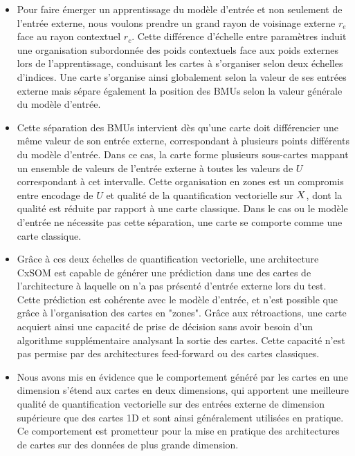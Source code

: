 \begin{itemize}
    \item Pour faire émerger un apprentissage du modèle d'entrée et non seulement de l'entrée externe, nous voulons prendre un grand rayon de voisinage externe $r_e$ face au rayon contextuel $r_c$. Cette différence d'échelle entre paramètres induit une organisation subordonnée des poids contextuels face aux poids externes lors de l'apprentissage, conduisant les cartes à s'organiser selon deux échelles d'indices. Une carte s'organise ainsi globalement selon la valeur de ses entrées externe mais sépare également la position des BMUs selon la valeur générale du modèle d'entrée.
    \item Cette séparation des BMUs intervient dès qu'une carte doit différencier une même valeur de son entrée externe, correspondant à plusieurs points différents du modèle d'entrée. Dans ce cas, la carte forme plusieurs sous-cartes mappant un ensemble de valeurs de l'entrée externe à toutes les valeurs de $U$ correspondant à cet intervalle. Cette organisation en zones est un compromis entre encodage de $U$ et qualité de la quantification vectorielle sur $X$, dont la qualité est réduite par rapport à une carte classique. Dans le cas ou le modèle d'entrée ne nécessite pas cette séparation, une carte se comporte comme une carte classique.
    \item Grâce à ces deux échelles de quantification vectorielle, une architecture CxSOM est capable de générer une prédiction dans une des cartes de l'architecture à laquelle on n'a pas présenté d'entrée externe lors du test.
    Cette prédiction est cohérente avec le modèle d'entrée, et n'est possible que grâce à l'organisation des cartes en "zones". Grâce aux rétroactions, une carte acquiert ainsi une capacité de prise de décision sans avoir besoin d'un algorithme supplémentaire analysant la sortie des cartes. Cette capacité n'est pas permise par des architectures feed-forward ou des cartes classiques. 
    \item Nous avons mis en évidence que le comportement généré par les cartes en une dimension s'étend aux cartes en deux dimensions, qui apportent une meilleure qualité de quantification vectorielle sur des entrées externe de dimension supérieure que des cartes 1D et sont ainsi généralement utilisées en pratique. Ce comportement est prometteur pour la mise en pratique des architectures de cartes sur des données de plus grande dimension.
\end{itemize}

